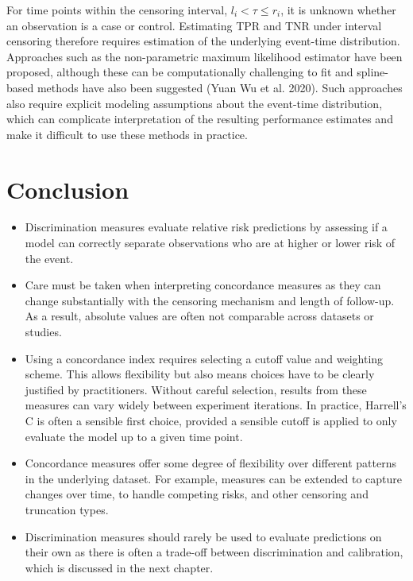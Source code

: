 \documentclass[
  letterpaper,
  krantz2]{style/krantz}
\providecommand{\tightlist}{%
  \setlength{\itemsep}{0pt}\setlength{\parskip}{0pt}}
\begin{document}
For time points within the censoring interval, \(l_i < \tau \le r_i\),
it is unknown whether an observation is a case or control. Estimating
TPR and TNR under interval censoring therefore requires estimation of
the underlying event-time distribution. Approaches such as the
non-parametric maximum likelihood
estimator have been
proposed, although these can be computationally challenging to fit and
spline-based methods have also been suggested (Yuan Wu et al. 2020).
Such approaches also require explicit modeling assumptions about the
event-time distribution, which can complicate interpretation of the
resulting performance estimates and make it difficult to use these
methods in practice.

\section{Conclusion}\label{conclusion-4}

\begin{tcolorbox}[enhanced jigsaw, toprule=.15mm, bottomtitle=1mm, opacityback=0, breakable, leftrule=.75mm, title={Key takeaways}, toptitle=1mm, bottomrule=.15mm, colback=white, colframe=quarto-callout-warning-color-frame, titlerule=0mm, opacitybacktitle=0.6, coltitle=black, rightrule=.15mm, left=2mm, colbacktitle=quarto-callout-warning-color!10!white, arc=.35mm]

\begin{itemize}
\tightlist
\item
  Discrimination measures evaluate relative risk predictions by
  assessing if a model can correctly separate observations who are at
  higher or lower risk of the event.
\item
  Care must be taken when interpreting concordance measures as they can
  change substantially with the censoring mechanism and length of
  follow-up. As a result, absolute values are often not comparable
  across datasets or studies.
\item
  Using a concordance index requires selecting a cutoff value and
  weighting scheme. This allows flexibility but also means choices have
  to be clearly justified by practitioners. Without careful selection,
  results from these measures can vary widely between experiment
  iterations. In practice, Harrell's C is often a sensible first choice,
  provided a sensible cutoff is applied to only evaluate the model up to
  a given time point.
\item
  Concordance measures offer some degree of flexibility over different
  patterns in the underlying dataset. For example, measures can be
  extended to capture changes over time, to handle competing risks, and
  other censoring and truncation types.
\item
  Discrimination measures should rarely be used to evaluate predictions
  on their own as there is often a trade-off between discrimination and
  calibration, which is discussed in the next chapter.
\end{itemize}

\end{tcolorbox}
\end{document}
